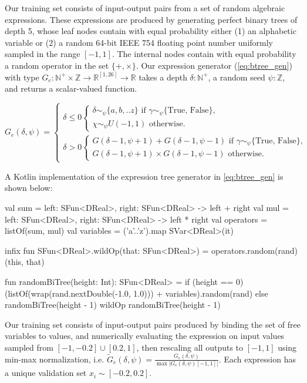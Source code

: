 Our training set consists of input-output pairs from a set of random algebraic expressions. These expressions are produced by generating perfect binary trees of depth 5, whose leaf nodes contain with equal probability either (1) an alphabetic variable or (2) a random 64-bit IEEE 754 floating point number uniformly sampled in the range $[-1, 1]$. The internal nodes contain with equal probability a random operator in the set $\{+, \times\}$. Our expression generator (\autoref{eq:btree_gen}) with type $G_e: \mathbb{N}^+\times\mathbb{Z} \rightarrow \mathbb{R}^{[1, 26]} \rightarrow \mathbb{R}$ takes a depth $\delta: \mathbb{N}^+$, a random seed $\psi: \mathbb{Z}$, and returns a scalar-valued function.

\begin{equation}\label{eq:btree_gen}
G_e(\delta, \psi) = \begin{cases}
    \delta \leq 0 \begin{cases}
    \delta\sim_\psi\{a,b,..z\} \text{ if } \gamma\sim_\psi\{\text{True, False}\},\\
    \chi\sim_\psi U(-1, 1) \text{ otherwise.}
    \end{cases} \\
    \delta > 0 \begin{cases}
    G(\delta-1, \psi + 1) + G(\delta-1, \psi - 1) \text{ if } \gamma\sim_\psi\{\text{True, False}\},\\
    G(\delta-1, \psi + 1) \times G(\delta-1, \psi - 1) \text{ otherwise.}
    \end{cases}
\end{cases}
\end{equation}

A Kotlin implementation of the expression tree generator in \autoref{eq:btree_gen} is shown below:
%
\begin{kotlinlisting}
val sum = { left: SFun<DReal>, right: SFun<DReal> -> left + right }
val mul = { left: SFun<DReal>, right: SFun<DReal> -> left * right }
val operators = listOf(sum, mul)
val variables = ('a'..'z').map { SVar<DReal>(it) }

infix fun SFun<DReal>.wildOp(that: SFun<DReal>) = operators.random(rand)(this, that)

fun randomBiTree(height: Int): SFun<DReal> =
  if (height == 0) (listOf(wrap(rand.nextDouble(-1.0, 1.0))) + variables).random(rand)
  else randomBiTree(height - 1) wildOp randomBiTree(height - 1)
\end{kotlinlisting}

Our training set consists of input-output pairs produced by binding the set of free variables to values, and numerically evaluating the expression on input values sampled from $[-1, -0.2] \cup [0.2, 1]$, then rescaling all outputs to $[-1, 1]$ using min-max normalization, i.e. $\tilde{G}_e(\delta, \psi)= \frac{G_e(\delta, \psi)}{\max |G_e(\delta, \psi)[-1, 1]|}$. Each expression has a unique validation set $x_i \sim [-0.2, 0.2]$.

